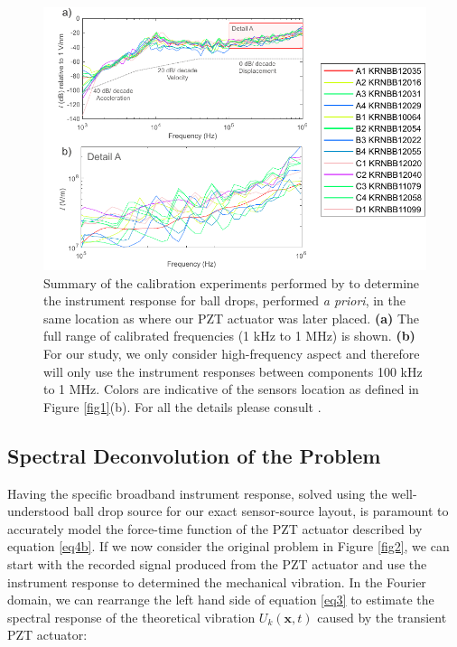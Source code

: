 \documentclass[preprint,3p, 11pt,authoryear]{elsarticle}
\begin{document}
{\begin{figure}[ht]
     	\centering
\includegraphics[scale= 1.0]{FIG6.pdf} 
\caption{Summary of the calibration experiments performed by \citet{Wu2020} to determine the instrument response for ball drops, performed \textit{a priori}, in the same location as where our PZT actuator was later placed. \textbf{(a)} The full range of calibrated frequencies (1 kHz to 1 MHz) is shown. \textbf{(b)} For our study, we only consider high-frequency aspect and therefore will only use the instrument responses between components 100 kHz to 1 MHz.  Colors are indicative of the sensors location as defined in Figure \ref{fig1}(b). For all the details please consult \citet{Wu2020}. }
	\label{fig6} 
\end{figure}

\subsection{Spectral Deconvolution of the Problem}
\label{Spec_deconv}
Having the specific broadband instrument response, solved using the well-understood ball drop source for our exact sensor-source layout, is paramount to accurately model the force-time function of the PZT actuator described by equation \eqref{eq4b}.   If we now consider the original problem in Figure \ref{fig2}, we can start with the recorded signal produced from the PZT actuator and use the instrument response to determined the mechanical vibration.  In the Fourier domain, we can rearrange the left hand side of equation \eqref{eq3} to estimate the spectral response of the theoretical vibration $U_{k}(\mathbf{x},t)$ caused by the transient PZT actuator:

}
\end{document}
